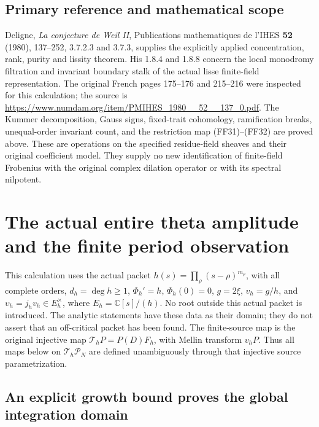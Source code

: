 \documentclass[11pt,a4paper]{article}
\theoremstyle{definition}
\begin{document}
\subsection{Primary reference and mathematical scope}

Deligne, \emph{La conjecture de Weil II},
Publications mathematiques de l'IHES \textbf{52} (1980), 137--252,
3.7.2.3 and 3.7.3, supplies the explicitly applied concentration,
rank, purity and lissity theorem.  His 1.8.4 and 1.8.8 concern
the local monodromy filtration and invariant boundary stalk
of the actual lisse finite-field representation.
The original French pages 175--176 and 215--216 were inspected
for this calculation; the source is
\url{https://www.numdam.org/item/PMIHES_1980__52__137_0.pdf}.
The Kummer decomposition, Gauss signs, fixed-trait cohomology,
ramification breaks, unequal-order invariant count, and the
restriction map (FF31)--(FF32) are proved above.
These are operations on the specified residue-field sheaves and
their original coefficient model.  They supply no new identification
of finite-field Frobenius with the original complex dilation
operator or with its spectral nilpotent.



\section{The actual entire theta amplitude and the finite period observation}
\label{sec:ipm-entire-source}

This calculation uses the actual packet
\(h(s)=\prod_\rho(s-\rho)^{m_\rho}\), with all complete orders,
\(d_h=\deg h\ge1\), \(\Phi_h'=h\), \(\Phi_h(0)=0\),
\(g=2\xi\), \(v_h=g/h\), and
\(\upsilon_h=j_hv_h\in E_h^\times\), where
\(E_h=\mathbb C[s]/(h)\). No root outside this actual packet is
introduced. The analytic statements have these data as their domain;
they do not assert that an off-critical packet has been found.
The finite-source map is the original injective map
\(\mathcal T_hP=P(D)F_h\), with Mellin transform \(v_hP\).
Thus all maps below on \(\mathcal T_h\mathcal P_N\) are defined
unambiguously through that injective source parametrization.

\subsection{An explicit growth bound proves the global integration domain}
\end{document}
